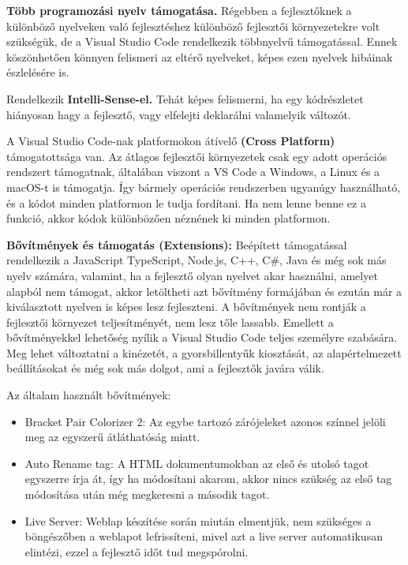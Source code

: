 \textbf{Több programozási nyelv támogatása.} Régebben a fejlesztőknek a különböző nyelveken való fejlesztéshez különböző fejlesztői környezetekre volt szükségük, de a Visual Studio Code rendelkezik többnyelvű támogatással. Ennek köszönhetően könnyen felismeri az eltérő nyelveket, képes ezen nyelvek hibáinak észlelésére is.

Rendelkezik \textbf{Intelli-Sense-el.} Tehát képes felismerni, ha egy kódrészletet hiányosan hagy a fejlesztő, vagy elfelejti deklarálni valamelyik változót. 

A Visual Studio Code-nak platformokon átívelő \textbf{(Cross Platform)} támogatottsága van. Az átlagos fejlesztői környezetek csak egy adott operációs rendszert támogatnak, általában viszont a VS Code a Windows, a Linux és a macOS-t is támogatja. Így bármely operációs rendszerben ugyanúgy használható, és a kódot minden platformon le tudja fordítani. Ha nem lenne benne ez a funkció, akkor kódok különbözően néznének ki minden platformon.

\textbf{Bővítmények és támogatás (Extensions):} Beépített támogatással rendelkezik a JavaScript TypeScript, Node.js, C++, C\#, Java és még sok más nyelv számára, valamint, ha a fejlesztő olyan nyelvet akar használni, amelyet alapból nem támogat, akkor letöltheti azt bővítmény formájában és ezután már a kiválasztott nyelven is képes lesz fejleszteni. A bővítmények nem rontják a fejlesztői környezet teljesítményét, nem lesz tőle lassabb. Emellett a bővítményekkel lehetőség nyílik a Visual Studio Code teljes személyre szabására. Meg lehet változtatni a kinézetét, a gyorsbillentyűk kiosztását, az alapértelmezett beállításokat és még sok más dolgot, ami a fejlesztők javára válik. 

Az általam használt bővítmények:

\begin{itemize}
    \item Bracket Pair Colorizer 2: Az egybe tartozó zárójeleket azonos színnel jelöli meg az egyszerű átláthatóság miatt.
    \item Auto Rename tag: A HTML dokumentumokban az első és utolsó tagot egyszerre írja át, így ha módosítani akarom, akkor nincs szükség az első tag módosítása után még megkeresni a második tagot.
    \item Live Server: Weblap készítése során miután elmentjük, nem szükséges a böngészőben a weblapot lefrissíteni, mivel azt a live server automatikusan elintézi, ezzel a fejlesztő időt tud megspórolni.
\end{itemize}

